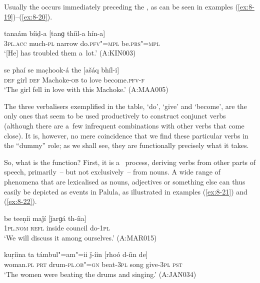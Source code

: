 Usually the  occurs immediately preceding the , as can be seen in examples (\ref{ex:8-19})--(\ref{ex:8-20}).

\begin{exe}
\ex
\label{ex:8-19}
\gll tanaám bíiḍ-a [tanɡ thíil-a hín-a] \\
\textsc{3pl.acc} much-\textsc{pl} narrow do.\textsc{pfv"=mpl} be.\textsc{prs"=mpl} \\
\glt `[He] has troubled them a~lot.' (A:KIN003)
\end{exe}
\begin{exe}
\ex
\label{ex:8-20}
\gll se phaí se mac̣hook-á the [ašáq bhíl-i] \\
\textsc{def} girl \textsc{def} Machoke-\textsc{ob} to  love become.\textsc{pfv-f} \\
\glt `The girl fell in love with this Machoke.' (A:MAA005)
\end{exe}

The three verbalisers exemplified in the table, `do', `give' and `become', are the only ones that seem to be used productively to construct conjunct verbs (although there are a~few infrequent combinations with other verbs that come close). It is, however, no mere coincidence that we find these particular verbs in the ``dummy'' role; as we shall see, they are functionally precisely what it takes. 


So, what is the function? First, it is a~ process, deriving verbs from other parts of speech, primarily~-- but not exclusively~-- from nouns. A wide range of phenomena that are lexicalised as nouns, adjectives or something else can thus easily be depicted as events in Palula, as illustrated in examples (\ref{ex:8-21}) and (\ref{ex:8-22}). 

\begin{exe}
\ex
\label{ex:8-21}
\gll be teeṇíi maǰí [ǰarɡá th-íia] \\
\textsc{1}\textsc{pl.nom} \textsc{refl} inside council do-\textsc{1pl} \\
\glt `We will discuss it among ourselves.' (A:MAR015)
\end{exe}
\begin{exe}
\ex
\label{ex:8-22}
\gll kuṛíina ta támbul"=am"=ii ǰ-íin [rhoó d-íin de] \\
woman.\textsc{pl} \textsc{prt} drum-\textsc{pl.ob"=gn} beat-\textsc{3pl} song give-\textsc{3pl}
\textsc{pst} \\
\glt `The women were beating the drums and singing.' (A:JAN034)
\end{exe}

